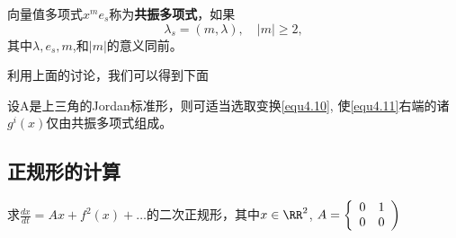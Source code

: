 \begin{defination}
  向量值多项式$x ^ { m } e _ { s }$称为\textbf{共振多项式}，如果
  \[
\lambda _ { s } = ( m , \lambda ) , \quad | m | \geqslant 2,
\]
其中\(\lambda,e_s,m\),和\(|m|\)的意义同前。
  \label{def:1.4.5}
\end{defination}

利用上面的讨论，我们可以得到下面

\begin{theorem}
  设A是上三角的Jordan标准形，则可适当选取变换\ref{equ4.10},
  使\ref{equ4.11}右端的诸\(g^i(x)\)仅由共振多项式组成。

\end{theorem}

\subsection{正规形的计算}

\begin{example}
  求$\frac { d x } { d t } = A x + f ^ { 2 } ( x ) + \dots$的二次正规形，其中\(x\in \RR^2\),
  $A = \left\{
    \begin{array} { l l }
      { 0 } & { 1 } \\
      { 0 } & { 0 }
    \end{array}
  \right)$
\end{example}

